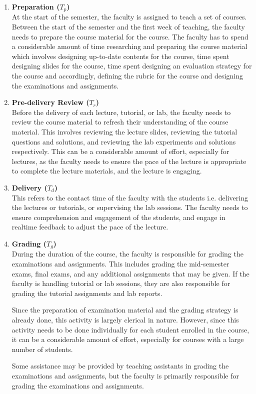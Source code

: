 \begin{enumerate}
  \item \textbf{Preparation (\(T_p\))} \\
        At the start of the semester, the faculty is assigned to teach a set of courses. Between the start of the semester and the first week of teaching, the faculty needs to prepare the course material for the course. The faculty has to spend a considerable amount of time researching and preparing the course material which involves designing up-to-date contents for the course, time spent designing slides for the course, time spent designing an evaluation strategy for the course and accordingly, defining the rubric for the course and designing the examinations and assignments.

  \item \textbf{Pre-delivery Review (\(T_r\))} \\
        Before the delivery of each lecture, tutorial, or lab, the faculty needs to review the course material to refresh their understanding of the course material. This involves reviewing the lecture slides, reviewing the tutorial questions and solutions, and reviewing the lab experiments and solutions respectively. This can be a considerable amount of effort, especially for lectures, as the faculty needs to ensure the pace of the lecture is appropriate to complete the lecture materials, and the lecture is engaging.

  \item \textbf{Delivery (\(T_d\))} \\
        This refers to the contact time of the faculty with the students i.e. delivering the lectures or tutorials, or supervising the lab sessions. The faculty needs to ensure comprehension and engagement of the students, and engage in realtime feedback to adjust the pace of the lecture.

  \item \textbf{Grading (\(T_g\))} \\
        During the duration of the course, the faculty is responsible for grading the examinations and assignments. This includes grading the mid-semester exams, final exams, and any additional assignments that may be given. If the faculty is handling tutorial or lab sessions, they are also responsible for grading the tutorial assignments and lab reports.

        Since the preparation of examination material and the grading strategy is already done, this activity is largely clerical in nature. However, since this activity needs to be done individually for each student enrolled in the course, it can be a considerable amount of effort, especially for courses with a large number of students.

        Some assistance may be provided by teaching assistants in grading the examinations and assignments, but the faculty is primarily responsible for grading the examinations and assignments.

\end{enumerate}

